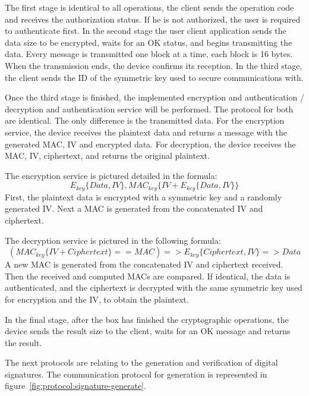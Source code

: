The first stage is identical to all operations, the client sends the operation code and receives the authorization status. If he is not authorized, the user is required to authenticate first.
In the second stage the user client application sends the data size to be encrypted, waits for an OK status, and begins transmitting the data. Every message is transmitted one block at a time, each block is 16 bytes.
When the transmission ends, the device confirms its reception.
In the third stage, the client sends the ID of the symmetric key used to secure communications with.

Once the third stage is finished, the implemented encryption and authentication / decryption and authentication service will be performed.
The protocol for both are identical. The only difference is the transmitted data. For the encryption service, the device receives the plaintext data and returns a message with the generated \ac{MAC}, \ac{IV} and encrypted data. For decryption, the device receives the \ac{MAC}, \ac{IV}, ciphertext, and returns the original plaintext.

The encryption service is pictured detailed in the formula:
\[E_{key}\{Data, IV\}, MAC_{key}\{IV+E_{key}\{Data, IV\}\}\]
First, the plaintext data is encrypted with a symmetric key and a randomly generated \ac{IV}. Next a \ac{MAC} is generated from the concatenated \ac{IV} and ciphertext.

The decryption service is pictured in the following formula:
\[(MAC_{key}\{IV+Ciphertext\} == MAC) => E_{key}\{Ciphertext, IV\} => Data\] 
A new \ac{MAC} is generated from the concatenated \ac{IV} and ciphertext received. Then the received and computed {MAC}s are compared. If identical, the data is authenticated, and the ciphertext is decrypted with the same symmetric key used for encryption and the \ac{IV}, to obtain the plaintext.

In the final stage, after the box has finished the cryptographic operations, the device sends the result size to the client, waits for an OK message and returns the result.

\hfill
\hfill

The next protocols are relating to the generation and verification of digital signatures.
The communication protocol for generation is represented in figure~\ref{fig:protocol:signature-generate}.

